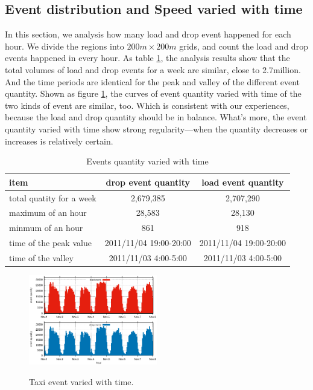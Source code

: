 \subsection{Event distribution and Speed varied with time}

In this section, we analysis how many load and drop event happened for each hour. We divide the regions into $200m\times200m$ grids, and count the load and drop events happened in every hour. As table \ref{table_event_distribution_with_time}, the analysis results show that the total volumes of load and drop events for a week are similar, close to 2.7million. And the time periods are identical for the peak and valley of the different event quantity. 
Shown as figure \ref{figure_event_varied_w_t}, the curves of event quantity varied with time of the two kinds of event are similar, too. Which is consistent  with our experiences, because the load and drop quantity should be in balance.  What’s more, the event quantity varied with time show strong regularity—when the quantity decreases or increases is relatively certain.

\begin{table}[!h]
\caption{Events quantity varied with time}\label{table_event_distribution_with_time}
\centering
\begin{tabular}{l|c|c}
 \hline
 item &drop event quantity &load event quantity \\
  \hline
  total quatity for a week& 2,679,385&2,707,290\\
  maximum of an hour&28,583 &28,130\\
  minmum of an hour&861&918\\
  time of the peak value&2011/11/04 19:00-20:00&2011/11/04 19:00-20:00\\
  time of the valley&2011/11/03 4:00-5:00&2011/11/03 4:00-5:00\\
  \hline
  \end{tabular}
\end{table}

\begin{figure}[!h]
\centering
\includegraphics[width=0.5\textwidth]{figures/analysis/event_w_time.eps}\\
\caption{Taxi event varied with time.}\label{figure_event_varied_w_t}
\end{figure}


